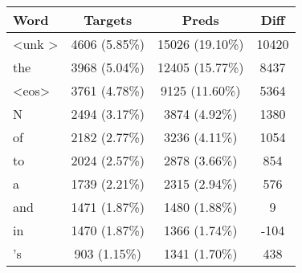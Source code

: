 \begin{tabular}{lccc}
\toprule
\textbf{Word} & \textbf{Targets} & \textbf{Preds} & \textbf{Diff} \\
\midrule
\textless unk \textgreater & 4606 (5.85\%) & 15026 (19.10\%) & 10420 \\
the & 3968 (5.04\%) & 12405 (15.77\%) & 8437 \\
\textless eos\textgreater & 3761 (4.78\%) & 9125 (11.60\%) & 5364 \\
N & 2494 (3.17\%) & 3874 (4.92\%)& 1380\\
of & 2182  (2.77\%) & 3236 (4.11\%)& 1054\\
to & 2024 (2.57\%) & 2878 (3.66\%)& 854\\
a & 1739  (2.21\%) & 2315 (2.94\%)& 576\\
and & 1471 (1.87\%) & 1480 (1.88\%) & 9\\
in & 1470 (1.87\%) & 1366 (1.74\%) & -104\\
's & 903  (1.15\%) & 1341 (1.70\%) & 438\\
\bottomrule
\end{tabular}
